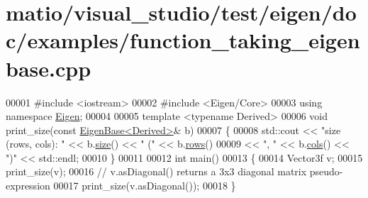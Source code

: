 \hypertarget{matio_2visual__studio_2test_2eigen_2doc_2examples_2function__taking__eigenbase_8cpp_source}{}\section{matio/visual\+\_\+studio/test/eigen/doc/examples/function\+\_\+taking\+\_\+eigenbase.cpp}
\label{matio_2visual__studio_2test_2eigen_2doc_2examples_2function__taking__eigenbase_8cpp_source}

\begin{DoxyCode}
00001 \textcolor{preprocessor}{#include <iostream>}
00002 \textcolor{preprocessor}{#include <Eigen/Core>}
00003 \textcolor{keyword}{using namespace }\hyperlink{namespace_eigen}{Eigen};
00004 
00005 \textcolor{keyword}{template} <\textcolor{keyword}{typename} Derived>
00006 \textcolor{keywordtype}{void} print\_size(\textcolor{keyword}{const} \hyperlink{group___core___module_struct_eigen_1_1_eigen_base}{EigenBase<Derived>}& b)
00007 \{
00008   std::cout << \textcolor{stringliteral}{"size (rows, cols): "} << b.\hyperlink{group___core___module_ac2c9348df3bb9c0044dbae6c278a8977}{size}() << \textcolor{stringliteral}{" ("} << b.\hyperlink{group___core___module_a8141320ba8df384426c298b32b000d8e}{rows}()
00009             << \textcolor{stringliteral}{", "} << b.\hyperlink{group___core___module_a7b0b45c7351847696c911ce8aa2abbdb}{cols}() << \textcolor{stringliteral}{")"} << std::endl;
00010 \}
00011 
00012 \textcolor{keywordtype}{int} main()
00013 \{
00014     Vector3f v;
00015     print\_size(v);
00016     \textcolor{comment}{// v.asDiagonal() returns a 3x3 diagonal matrix pseudo-expression}
00017     print\_size(v.asDiagonal());
00018 \}
\end{DoxyCode}
